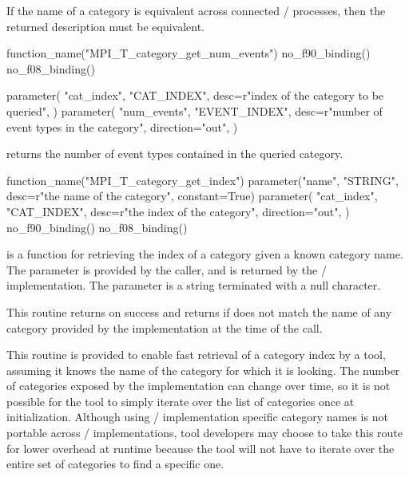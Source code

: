If the name of a category is equivalent across connected \MPI/ processes, then
the returned description must be equivalent.

\begin{mpi-binding}
    function_name("MPI_T_category_get_num_events")
    no_f90_binding()
    no_f08_binding()

    parameter(
        "cat_index",
        "CAT_INDEX",
        desc=r"index of the category to be queried",
    )
    parameter(
        "num_events",
        "EVENT_INDEX",
        desc=r"number of event types in the category",
        direction="out",
    )
\end{mpi-binding}

 returns the number of event types
contained in the queried category.

\begin{mpi-binding}
    function_name("MPI_T_category_get_index")
    parameter("name", "STRING", desc=r"the name of the category", constant=True)
    parameter(
        "cat_index",
        "CAT_INDEX",
        desc=r"the index of the category",
        direction="out",
    )
    no_f90_binding()
    no_f08_binding()
\end{mpi-binding}

 is a function for retrieving the index of a category given a known category name.
The  parameter is provided by the caller, and  is returned by the \MPI/ implementation.
The  parameter is a string terminated with a null character.

This routine returns  on success and returns
 if  does not match the name
of any category provided by the implementation at the time of the call.

\begin{rationale}
This routine is provided to enable fast retrieval of a category index by a
tool, assuming it knows the name of the category for which it is looking.
The number of categories exposed by the implementation can change over
time, so it is not possible for the tool to simply iterate over the list of
categories once at initialization.  Although using \MPI/ implementation
specific category names is not portable across \MPI/ implementations, tool
developers may choose to take this route for lower overhead at runtime
because the tool will not have to iterate over the entire set of categories
to find a specific one.
\end{rationale}

